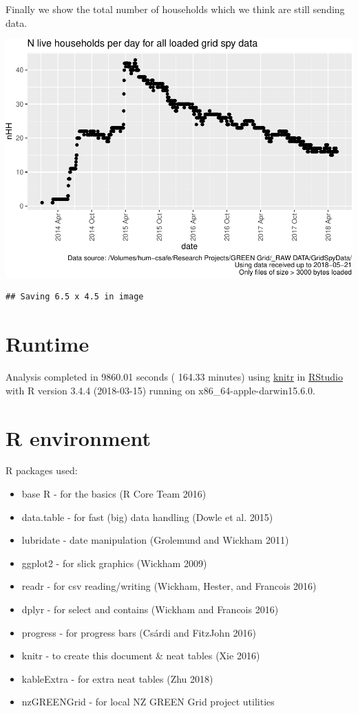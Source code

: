 \documentclass[]{article}
\providecommand{\tightlist}{%
  \setlength{\itemsep}{0pt}\setlength{\parskip}{0pt}}
\begin{document}
Finally we show the total number of households which we think are still
sending data.

\includegraphics{processNZGGElecCons1minData_files/figure-latex/liveDataHouseholds-1.pdf}

\begin{verbatim}
## Saving 6.5 x 4.5 in image
\end{verbatim}

\section{Runtime}\label{runtime}

Analysis completed in 9860.01 seconds ( 164.33 minutes) using
\href{https://cran.r-project.org/package=knitr}{knitr} in
\href{http://www.rstudio.com}{RStudio} with R version 3.4.4 (2018-03-15)
running on x86\_64-apple-darwin15.6.0.

\section{R environment}\label{r-environment}

R packages used:

\begin{itemize}
\tightlist
\item
  base R - for the basics (R Core Team 2016)
\item
  data.table - for fast (big) data handling (Dowle et al. 2015)
\item
  lubridate - date manipulation (Grolemund and Wickham 2011)
\item
  ggplot2 - for slick graphics (Wickham 2009)
\item
  readr - for csv reading/writing (Wickham, Hester, and Francois 2016)
\item
  dplyr - for select and contains (Wickham and Francois 2016)
\item
  progress - for progress bars (Csárdi and FitzJohn 2016)
\item
  knitr - to create this document \& neat tables (Xie 2016)
\item
  kableExtra - for extra neat tables (Zhu 2018)
\item
  nzGREENGrid - for local NZ GREEN Grid project utilities
\end{itemize}
\end{document}
